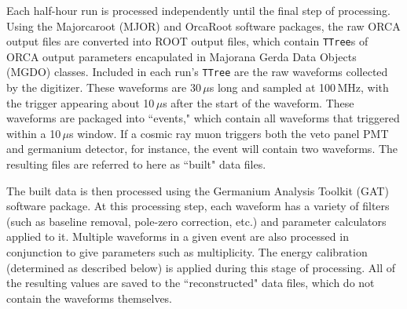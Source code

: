 Each half-hour run is processed independently until the final step of processing. Using the Majorcaroot (MJOR)  and OrcaRoot software packages, the raw ORCA output files are converted into ROOT output files, which contain {\tt TTree}s of ORCA output parameters encapulated in Majorana Gerda Data Objects (MGDO) classes. Included in each run's {\tt TTree} are the raw waveforms collected by the digitizer. These waveforms are 30\,$\mu$s long and sampled at 100\,MHz, with the trigger appearing about 10\,$\mu$s after the start of the waveform. These waveforms are packaged into ``events," which contain all waveforms that triggered within a 10\,$\mu$s window. If a cosmic ray muon triggers both the veto panel PMT and germanium detector, for instance, the event will contain two waveforms. The resulting files are referred to here as ``built" data files.

The built data is then processed using the Germanium Analysis Toolkit (GAT) software package. At this processing step, each waveform has a variety of filters (such as baseline removal, pole-zero correction, etc.) and parameter calculators applied to it. Multiple waveforms in a given event are also processed in conjunction to give parameters such as multiplicity. The energy calibration (determined as described below) is applied during this stage of processing. All of the resulting values are saved to the ``reconstructed" data files, which do not contain the waveforms themselves. 

